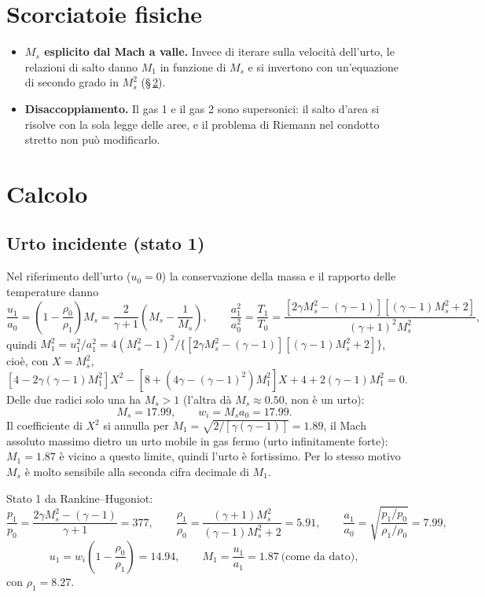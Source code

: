 \documentclass[11pt,a4paper]{article}
\newcommand{\Ms}{M_{s}}
\begin{document}
\section{Scorciatoie fisiche}
\begin{itemize}
  \item \textbf{$\Ms$ esplicito dal Mach a valle.} Invece di iterare sulla velocità dell'urto, le relazioni di salto
    danno $M_1$ in funzione di $\Ms$ e si invertono con un'equazione di secondo grado in $\Ms^2$
    (\S\,\ref{sec:calcolo}).
  \item \textbf{Disaccoppiamento.} Il gas 1 e il gas 2 sono supersonici: il salto d'area si risolve con la sola
    legge delle aree, e il problema di Riemann nel condotto stretto non può modificarlo.
\end{itemize}

\section{Calcolo}\label{sec:calcolo}

\subsection{Urto incidente (stato 1)}
Nel riferimento dell'urto ($u_0=0$) la conservazione della massa e il rapporto delle temperature danno
\[
  \frac{u_1}{a_0}=\left(1-\frac{\rho_0}{\rho_1}\right)\Ms=\frac{2}{\gamma+1}\left(\Ms-\frac1{\Ms}\right),\qquad
  \frac{a_1^2}{a_0^2}=\frac{T_1}{T_0}=\frac{\left[2\gamma\Ms^2-(\gamma-1)\right]\left[(\gamma-1)\Ms^2+2\right]}{(\gamma+1)^2\Ms^2},
\]
quindi $M_1^2=u_1^2/a_1^2=4(\Ms^2-1)^2\big/\{[2\gamma\Ms^2-(\gamma-1)][(\gamma-1)\Ms^2+2]\}$, cioè, con $X=\Ms^2$,
\[
  \left[4-2\gamma(\gamma-1)M_1^2\right]X^2-\left[8+\left(4\gamma-(\gamma-1)^2\right)M_1^2\right]X+4+2(\gamma-1)M_1^2=0 .
\]
Delle due radici solo una ha $\Ms>1$ (l'altra dà $\Ms\approx\num{0.50}$, non è un urto):
\[
  \Ms=\num{17.99},\qquad w_i=\Ms a_0=\num{17.99}.
\]
Il coefficiente di $X^2$ si annulla per $M_1=\sqrt{2/[\gamma(\gamma-1)]}=\num{1.89}$, il Mach assoluto massimo
dietro un urto mobile in gas fermo (urto infinitamente forte): $M_1=\num{1.87}$ è vicino a questo limite, quindi
l'urto è fortissimo. Per lo stesso motivo $\Ms$ è molto sensibile alla seconda cifra decimale di $M_1$.

Stato 1 da Rankine--Hugoniot:
\[
  \frac{p_1}{p_0}=\frac{2\gamma\Ms^2-(\gamma-1)}{\gamma+1}=\num{377},\qquad
  \frac{\rho_1}{\rho_0}=\frac{(\gamma+1)\Ms^2}{(\gamma-1)\Ms^2+2}=\num{5.91},\qquad
  \frac{a_1}{a_0}=\sqrt{\frac{p_1/p_0}{\rho_1/\rho_0}}=\num{7.99},
\]
\[
  u_1=w_i\left(1-\frac{\rho_0}{\rho_1}\right)=\num{14.94},\qquad M_1=\frac{u_1}{a_1}=\num{1.87}\ \text{(come da dato)},
\]
con $\rho_1=\num{8.27}$.
\end{document}
